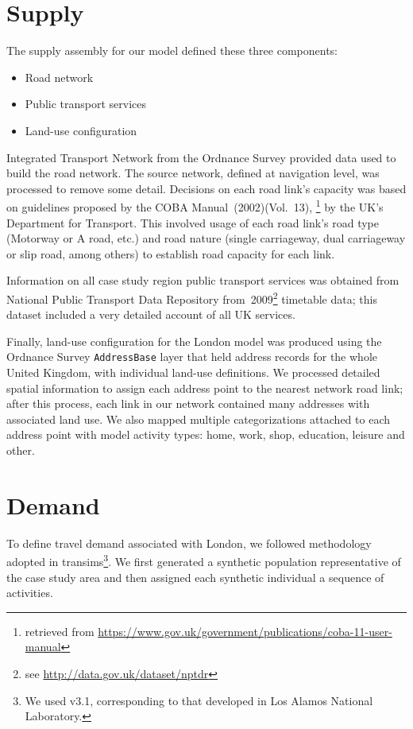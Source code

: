 \section{Supply}
The supply assembly for our model defined these three components:
%
\begin{itemize}\styleItemize
\item	Road network
\item	Public transport services
\item	Land-use configuration
\end{itemize}
%
Integrated Transport Network from the Ordnance Survey provided data used to build the road network. 
The source network, defined at navigation level, was processed to remove some detail. 
Decisions on each road link's capacity was based on guidelines proposed by the COBA Manual~(2002)(Vol.~13),
\footnote{retrieved from \url{https://www.gov.uk/government/publications/coba-11-user-manual}} 
by the UK’s Department for Transport. 
This involved usage of each road link’s road type (Motorway or A road, etc.) and road nature (single carriageway, dual carriageway or slip road, among others) to establish road capacity for each link.

Information on all case study region public transport services was obtained from National Public Transport Data Repository from~2009\footnote{see \url{http://data.gov.uk/dataset/nptdr}} timetable data; this dataset included a very detailed account of all UK services.

Finally, land-use configuration for the London model was produced using the Ordnance Survey \lstinline|AddressBase| layer that held address records for the whole United Kingdom, with individual land-use definitions. 
We processed detailed spatial information to assign each address point to the nearest network road link; after this process, each link in our network contained many addresses with associated land use. 
We also mapped multiple categorizations attached to each address point with model activity types: home, work, shop, education, leisure and other.

\section{Demand}
To define travel demand associated with London, we followed methodology adopted in \gls{transims}\footnote {We used v3.1, corresponding to that developed in Los Alamos National Laboratory.}. We first generated a synthetic population representative of the case study area and then assigned each synthetic individual a sequence of activities.

